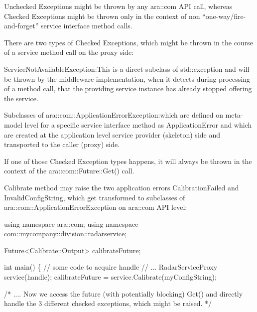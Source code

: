 \begin{DoxyItemize}
\item Unchecked Exceptions might be thrown by any ara\+::com A\+PI call, whereas Checked Exceptions might be thrown only in the context of non “one-\/way/fire-\/and-\/forget” service interface method calls.
\item There are two types of Checked Exceptions, which might be thrown in the course of a service method call on the proxy side\+:
\item Service\+Not\+Available\+Exception\+:This is a direct subclass of std\+::exception and will be thrown by the middleware implementation, when it detects during processing of a method call, that the providing service instance has already stopped offering the service.
\item Subclasses of ara\+::com\+::\+Application\+Error\+Exception\+:which are defined on meta-\/model level for a specific service interface method as Application\+Error and which are created at the application level service provider (skeleton) side and transported to the caller (proxy) side.
\item If one of those Checked Exception types happens, it will always be thrown in the context of the ara\+::com\+::\+Future\+::\+Get() call.
\item Calibrate method may raise the two application errors Calibration\+Failed and Invalid\+Config\+String, which get transformed to subclasses of ara\+::com\+::\+Application\+Error\+Exception on ara\+::com A\+PI level\+: 
\begin{DoxyCode}
 \textcolor{keyword}{using namespace }ara::com;
 \textcolor{keyword}{using namespace }com::mycompany::division::radarservice;

 Future<Calibrate::Output> calibrateFuture;

 \textcolor{keywordtype}{int} main() \{
 \textcolor{comment}{// some code to acquire handle}
 \textcolor{comment}{// ...}
 RadarServiceProxy service(handle);
 calibrateFuture = service.Calibrate(myConfigString);

 \textcolor{comment}{/* ....}
\textcolor{comment}{ Now we access the future (with potentially blocking) Get()}
\textcolor{comment}{ and directly handle the 3 different checked exceptions, which}
\textcolor{comment}{ might be raised. */}


\end{DoxyCode}
\end{DoxyItemize}
